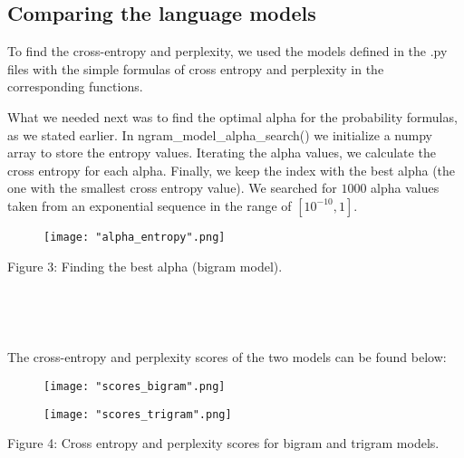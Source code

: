 \documentclass[11pt, a4paper]{article}
\begin{document}
	\subsection{Comparing the language models}
	
	To find the cross-entropy and perplexity, we used the models defined in the .py files with the simple formulas of cross entropy and perplexity in the corresponding functions. 
	
	What we needed next was to find the optimal alpha for the probability formulas, as we stated earlier. In ngram\_model\_alpha\_search() we initialize a numpy array to store the entropy values. Iterating the alpha values, we calculate the cross entropy for each alpha. Finally, we keep the index with the best alpha (the one with the smallest cross entropy value). We searched for $1000$ alpha values taken from an exponential sequence in the range of $[10^{-10}, 1]$.

 \begin{figure}[H]
    \centering
    \texttt{[image: "alpha\_entropy".png]}
    
    \label{fig:galaxy}
\end{figure}


\begin{centering}



\renewcommand{\caption}{Figure 3: }
\caption{Finding the best alpha (bigram model).}

\end{centering} 

\

\

The cross-entropy and perplexity scores of the two models can be found below:

\begin{figure}[H]
    \centering
    \texttt{[image: "scores\_bigram".png]}
    
    \label{fig:galaxy}
\end{figure}

\begin{figure}[H]
    \centering
    \texttt{[image: "scores\_trigram".png]}
    
    \label{fig:galaxy}
\end{figure}

\begin{centering}



\renewcommand{\caption}{Figure 4: }
\caption{Cross entropy and perplexity scores for bigram and trigram models.}

\end{centering} 
	\newpage
\end{document}
